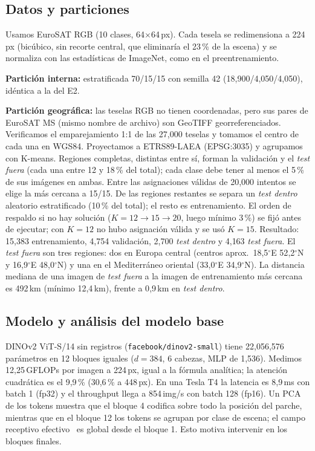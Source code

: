 \documentclass[conference,a4paper]{IEEEtran}
\begin{document}
\subsection{Datos y particiones}
Usamos EuroSAT RGB (10 clases, 64$\times$64\,px). Cada tesela se redimensiona a 224\,px (bicúbico, sin recorte central, que eliminaría el 23\,\% de la escena) y se normaliza con las estadísticas de ImageNet, como en el preentrenamiento.

\textbf{Partición interna:} estratificada 70/15/15 con semilla 42 (18{,}900/4{,}050/4{,}050), idéntica a la del E2.

\textbf{Partición geográfica:} las teselas RGB no tienen coordenadas, pero sus pares de EuroSAT MS (mismo nombre de archivo) son GeoTIFF georreferenciados. Verificamos el emparejamiento 1:1 de las 27{,}000 teselas y tomamos el centro de cada una en WGS84. Proyectamos a ETRS89-LAEA (EPSG:3035) y agrupamos con K-means. Regiones completas, distintas entre sí, forman la validación y el \emph{test fuera} (cada una entre 12 y 18\,\% del total); cada clase debe tener al menos el 5\,\% de sus imágenes en ambas. Entre las asignaciones válidas de 20{,}000 intentos se elige la más cercana a 15/15. De las regiones restantes se separa un \emph{test dentro} aleatorio estratificado (10\,\% del total); el resto es entrenamiento. El orden de respaldo si no hay solución ($K{=}12\rightarrow15\rightarrow20$, luego mínimo 3\,\%) se fijó antes de ejecutar; con $K{=}12$ no hubo asignación válida y se usó $K{=}15$. Resultado: 15{,}383 entrenamiento, 4{,}754 validación, 2{,}700 \emph{test dentro} y 4{,}163 \emph{test fuera}. El \emph{test fuera} son tres regiones: dos en Europa central (centros aprox.\ 18{,}5$^\circ$E 52{,}2$^\circ$N y 16{,}9$^\circ$E 48{,}0$^\circ$N) y una en el Mediterráneo oriental (33{,}0$^\circ$E 34{,}9$^\circ$N). La distancia mediana de una imagen de \emph{test fuera} a la imagen de entrenamiento más cercana es 492\,km (mínimo 12{,}4\,km), frente a 0{,}9\,km en \emph{test dentro}.

\subsection{Modelo y análisis del modelo base}
DINOv2 ViT-S/14 sin registros (\texttt{facebook/dinov2-small}) tiene 22{,}056{,}576 parámetros en 12 bloques iguales ($d{=}384$, 6 cabezas, MLP de 1{,}536). Medimos 12{,}25\,GFLOPs por imagen a 224\,px, igual a la fórmula analítica; la atención cuadrática es el 9{,}9\,\% (30{,}6\,\% a 448\,px). En una Tesla T4 la latencia es 8{,}9\,ms con batch 1 (fp32) y el throughput llega a 854\,img/s con batch 128 (fp16). Un PCA de los tokens muestra que el bloque 4 codifica sobre todo la posición del parche, mientras que en el bloque 12 los tokens se agrupan por clase de escena; el campo receptivo efectivo~\cite{luo2016} es global desde el bloque 1. Esto motiva intervenir en los bloques finales.
\end{document}
